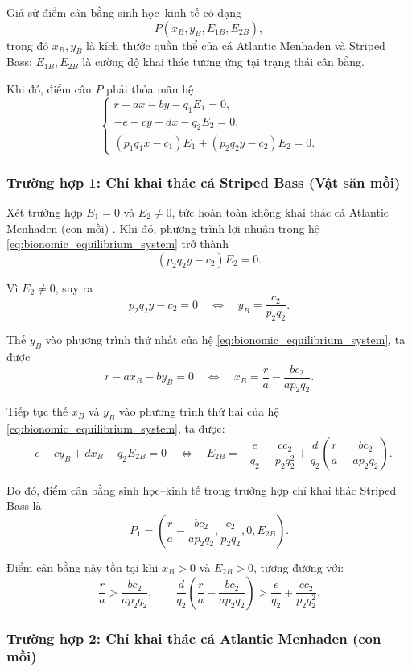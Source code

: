 Giả sử điểm cân bằng sinh học--kinh tế có dạng
\[
P(x_B,y_B,E_{1B},E_{2B}),
\]
trong đó $x_B,y_B$ là kích thước quần thể của cá Atlantic Menhaden và Striped Bass; $E_{1B},E_{2B}$ là cường độ khai thác tương ứng tại trạng thái cân bằng.

\vspace{0.3cm}

Khi đó, điểm cân $P$ phải thỏa mãn hệ
\begin{equation}
\begin{cases}
r-ax-by-q_1E_1=0,\\[4pt]
-e-cy+dx-q_2E_2=0,\\[4pt]
(p_1q_1x-c_1)E_1+(p_2q_2y-c_2)E_2=0.
\end{cases}
\label{eq:bionomic_equilibrium_system}
\end{equation}

\subsubsection{Trường hợp 1: Chỉ khai thác cá Striped Bass (Vật săn mồi)}

Xét trường hợp $E_1=0$ và $E_2\neq 0$, tức hoàn toàn không khai thác cá Atlantic Menhaden (con mồi) .
Khi đó, phương trình lợi nhuận trong hệ
\eqref{eq:bionomic_equilibrium_system} trở thành
\[
(p_2q_2y-c_2)E_2=0.
\]

Vì $E_2\neq 0$, suy ra
\[
p_2q_2y-c_2=0
\quad\Longleftrightarrow\quad
y_B=\frac{c_2}{p_2q_2}.
\]

Thế $y_B$ vào phương trình thứ nhất của hệ \eqref{eq:bionomic_equilibrium_system}, ta được
\[
r-ax_B-by_B=0
\quad\Longleftrightarrow\quad
x_B=\frac{r}{a}-\frac{bc_2}{ap_2q_2}.
\]

Tiếp tục thế $x_B$ và $y_B$ vào phương trình thứ hai của hệ \eqref{eq:bionomic_equilibrium_system}, ta được:
\[
-e-cy_B+dx_B-q_2E_{2B}=0
\quad\Longleftrightarrow\quad
E_{2B}
=
-\frac{e}{q_2}
-
\frac{cc_2}{p_2q_2^2}
+
\frac{d}{q_2}
\left(
\frac{r}{a}
-
\frac{bc_2}{ap_2q_2}
\right).
\]

Do đó, điểm cân bằng sinh học--kinh tế trong trường hợp chỉ khai thác
Striped Bass là
\[
P_1
=
\left(
\frac{r}{a}-\frac{bc_2}{ap_2q_2},
\frac{c_2}{p_2q_2},
0,
E_{2B}
\right).
\]

Điểm cân bằng này tồn tại khi $x_B>0$ và $E_{2B}>0$, tương đương với:
\[
\frac{r}{a}>\frac{bc_2}{ap_2q_2},
\qquad
\frac{d}{q_2}
\left(
\frac{r}{a}-\frac{bc_2}{ap_2q_2}
\right)
>
\frac{e}{q_2}
+
\frac{cc_2}{p_2q_2^2}.
\]

\subsubsection{Trường hợp 2: Chỉ khai thác cá Atlantic Menhaden (con mồi)}

